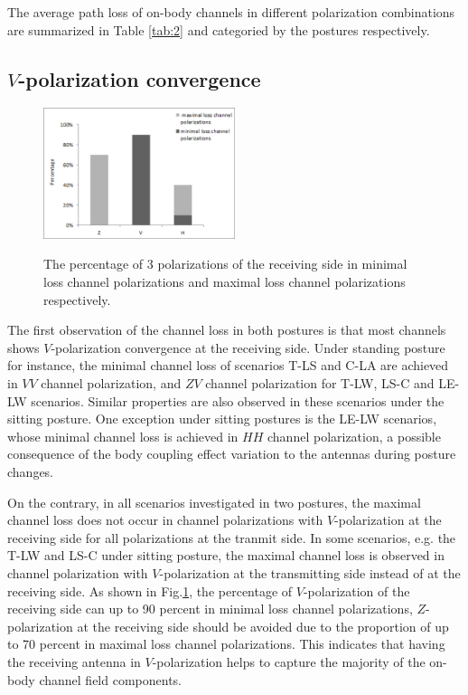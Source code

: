 \documentclass[conference]{IEEEtran}
\begin{document}
The average path loss of on-body channels in different polarization combinations are summarized in Table \ref{tab:2} and categoried by the postures respectively. 

\subsection{$V$-polarization convergence}

\begin{figure}[!t]
  \centering
  \includegraphics[width=0.5\textwidth]{figs/6.eps}\\
  \caption{The percentage of 3 polarizations of the receiving side in minimal loss channel polarizations and maximal loss channel polarizations respectively.}
  \label{fig:polarization percentage}
\end{figure}

The first observation of the channel loss in both postures is that most channels shows $V$-polarization convergence at the receiving side. Under standing posture for instance,  the minimal channel loss of scenarios T-LS and C-LA are achieved in $VV$ channel polarization, and $ZV$ channel polarization for T-LW, LS-C and LE-LW scenarios. Similar properties are also observed in these scenarios under the sitting posture. One exception under sitting postures is the LE-LW scenarios, whose minimal channel loss is achieved in $HH$ channel polarization, a possible consequence of the body coupling effect variation to the antennas during posture changes. 

On the contrary, in all scenarios investigated in two postures, the maximal channel loss does not occur in channel polarizations with $V$-polarization at the receiving side for all polarizations at the tranmit side.  In some scenarios, e.g. the T-LW and LS-C under sitting posture, the maximal channel loss is observed in channel polarization with $V$-polarization at the transmitting side instead of at the receiving side. As shown in Fig.\ref{fig:polarization percentage}, the percentage of $V$-polarization of the receiving side can up to 90 percent in minimal loss channel polarizations, $Z$-polarization at the receiving side should be avoided due to the proportion of up to 70 percent in maximal loss channel polarizations. This indicates that having the receiving antenna in $V$-polarization helps to capture the majority of the on-body channel field components.
\end{document}
